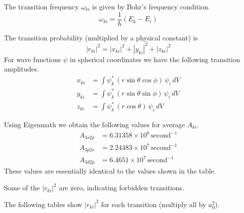 \documentclass[12pt]{article}
\begin{document}
\noindent
The transition frequency $\omega_{ki}$ is given by Bohr's frequency condition.
\begin{equation*}
\omega_{ki}=\frac{1}{\hbar}(E_k-E_i)
\end{equation*}

\noindent
The transition probability (multiplied by a physical constant) is
\begin{equation*}
|r_{ki}|^2
=|x_{ki}|^2
+|y_{ki}|^2
+|z_{ki}|^2
\end{equation*}
For wave functions $\psi$ in spherical coordinates we have the following transition amplitudes.
\begin{align*}
x_{ki}&=\int\psi_k^*\,(r\sin\theta\cos\phi)\,\psi_i\,dV
\\
y_{ki}&=\int\psi_k^*\,(r\sin\theta\sin\phi)\,\psi_i\,dV
\\
z_{ki}&=\int\psi_k^*\,(r\cos\theta)\,\psi_i\,dV
\end{align*}

\noindent
Using Eigenmath we obtain the following values for average $A_{ki}$.
\begin{align*}
A_{3s2p}&=6.31358\times10^6\,\text{second}^{-1}
\\
A_{3p2s}&=2.24483\times10^7\,\text{second}^{-1}
\\
A_{3d2p}&=6.4651\times10^7\,\text{second}^{-1}
\end{align*}
These values are essentially identical to the values shown in the table.

\bigskip
\noindent
Some of the $|r_{ki}|^2$ are zero, indicating forbidden transitions.

\bigskip
\noindent
The following tables show $|r_{ki}|^2$ for each transition (multiply all by $a_0^2$).
\end{document}
